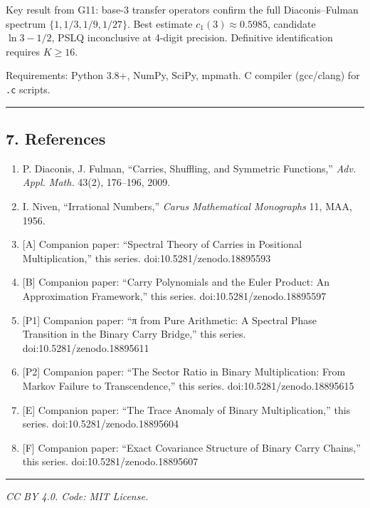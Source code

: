 \documentclass[
  11pt,
]{article}
\providecommand{\tightlist}{%
  \setlength{\itemsep}{0pt}\setlength{\parskip}{0pt}}
\begin{document}
Key result from G11: base-3 transfer operators confirm the full Diaconis--Fulman
spectrum \(\lbrace{}1, 1/3, 1/9, 1/27\rbrace{}\). Best estimate
\(c_1(3) \approx 0.5985\), candidate \(\ln 3 - 1/2\), PSLQ inconclusive at
4-digit precision. Definitive identification requires \(K \geq 16\).

Requirements: Python 3.8+, NumPy, SciPy, mpmath. C compiler (gcc/clang) for
\texttt{.c} scripts.

\begin{center}\rule{0.5\linewidth}{0.5pt}\end{center}

\newpage

\subsection{7. References}\label{references}

\begin{enumerate}
\def\labelenumi{\arabic{enumi}.}
\tightlist
\item
  P. Diaconis, J. Fulman, ``Carries, Shuffling, and Symmetric Functions,''
  \emph{Adv. Appl. Math.} 43(2), 176--196, 2009.
\item
  I. Niven, ``Irrational Numbers,'' \emph{Carus Mathematical Monographs} 11,
  MAA, 1956.
\item
  {[}A{]} Companion paper: ``Spectral Theory of Carries in Positional
  Multiplication,'' this series. doi:10.5281/zenodo.18895593
\item
  {[}B{]} Companion paper: ``Carry Polynomials and the Euler Product: An
  Approximation Framework,'' this series. doi:10.5281/zenodo.18895597
\item
  {[}P1{]} Companion paper: ``π from Pure Arithmetic: A Spectral Phase
  Transition in the Binary Carry Bridge,'' this series.
  doi:10.5281/zenodo.18895611
\item
  {[}P2{]} Companion paper: ``The Sector Ratio in Binary Multiplication: From
  Markov Failure to Transcendence,'' this series. doi:10.5281/zenodo.18895615
\item
  {[}E{]} Companion paper: ``The Trace Anomaly of Binary Multiplication,'' this
  series. doi:10.5281/zenodo.18895604
\item
  {[}F{]} Companion paper: ``Exact Covariance Structure of Binary Carry
  Chains,'' this series. doi:10.5281/zenodo.18895607
\end{enumerate}

\begin{center}\rule{0.5\linewidth}{0.5pt}\end{center}

\emph{CC BY 4.0. Code: MIT License.}
\end{document}
